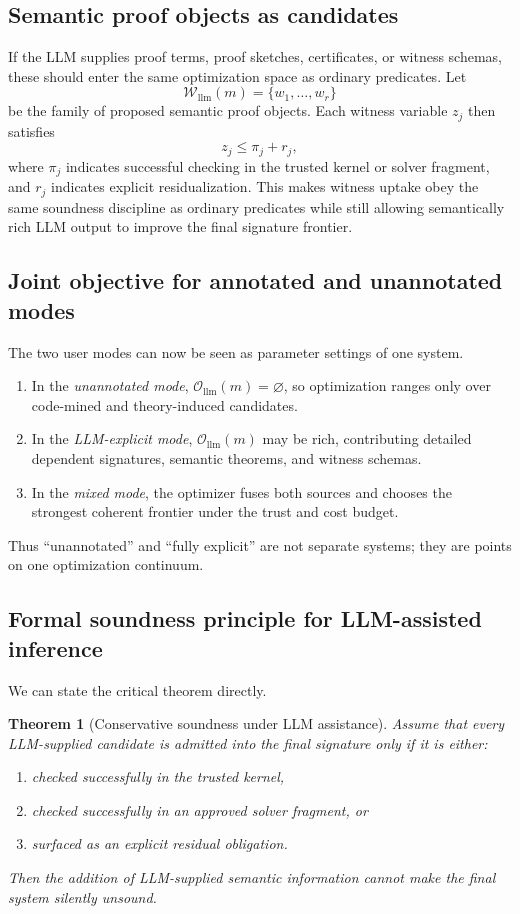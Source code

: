 \documentclass[11pt]{article}
\theoremstyle{definition}
\theoremstyle{plain}
\newtheorem{theorem}[definition]{Theorem}
\begin{document}
\subsection{Semantic proof objects as candidates}
If the LLM supplies proof terms, proof sketches, certificates, or witness
schemas, these should enter the same optimization space as ordinary predicates.
Let
\[
\mathcal{W}_{\mathrm{llm}}(m) = \{w_1, \ldots, w_r\}
\]
be the family of proposed semantic proof objects. Each witness variable $z_j$
then satisfies
\[
z_j \le \pi_j + r_j,
\]
where $\pi_j$ indicates successful checking in the trusted kernel or solver
fragment, and $r_j$ indicates explicit residualization. This makes witness uptake
obey the same soundness discipline as ordinary predicates while still allowing
semantically rich LLM output to improve the final signature frontier.

\subsection{Joint objective for annotated and unannotated modes}
The two user modes can now be seen as parameter settings of one system.
\begin{enumerate}[label=\arabic*.]
  \item In the \emph{unannotated mode}, $\mathcal{O}_{\mathrm{llm}}(m) = \varnothing$,
  so optimization ranges only over code-mined and theory-induced candidates.
  \item In the \emph{LLM-explicit mode}, $\mathcal{O}_{\mathrm{llm}}(m)$ may be rich,
  contributing detailed dependent signatures, semantic theorems, and witness
  schemas.
  \item In the \emph{mixed mode}, the optimizer fuses both sources and chooses
  the strongest coherent frontier under the trust and cost budget.
\end{enumerate}
Thus ``unannotated'' and ``fully explicit'' are not separate systems; they are
points on one optimization continuum.

\subsection{Formal soundness principle for LLM-assisted inference}
We can state the critical theorem directly.

\begin{theorem}[Conservative soundness under LLM assistance]
Assume that every LLM-supplied candidate is admitted into the final signature only
if it is either:
\begin{enumerate}[label=\arabic*.]
  \item checked successfully in the trusted kernel,
  \item checked successfully in an approved solver fragment, or
  \item surfaced as an explicit residual obligation.
\end{enumerate}
Then the addition of LLM-supplied semantic information cannot make the final
system silently unsound.
\end{theorem}
\end{document}
